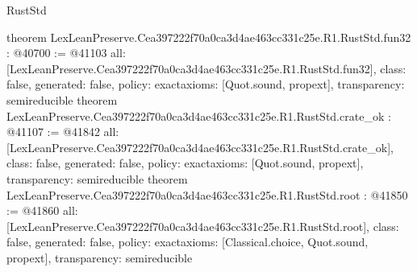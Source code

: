 \begin{lexlean}{RustStd}
\begin{coremodule}
{}
theorem LexLeanPreserve.Cea397222f70a0ca3d4ae463cc331c25e.R1.RustStd.fun32 : @40700 := @41103 {
  all: [LexLeanPreserve.Cea397222f70a0ca3d4ae463cc331c25e.R1.RustStd.fun32],
  class: false,
  generated: false,
  policy: exact{axioms: [Quot.sound, propext]},
  transparency: semireducible
}
theorem LexLeanPreserve.Cea397222f70a0ca3d4ae463cc331c25e.R1.RustStd.crate_ok : @41107 := @41842 {
  all: [LexLeanPreserve.Cea397222f70a0ca3d4ae463cc331c25e.R1.RustStd.crate_ok],
  class: false,
  generated: false,
  policy: exact{axioms: [Quot.sound, propext]},
  transparency: semireducible
}
theorem LexLeanPreserve.Cea397222f70a0ca3d4ae463cc331c25e.R1.RustStd.root : @41850 := @41860 {
  all: [LexLeanPreserve.Cea397222f70a0ca3d4ae463cc331c25e.R1.RustStd.root],
  class: false,
  generated: false,
  policy: exact{axioms: [Classical.choice, Quot.sound, propext]},
  transparency: semireducible
}


\end{coremodule}
\end{lexlean}
